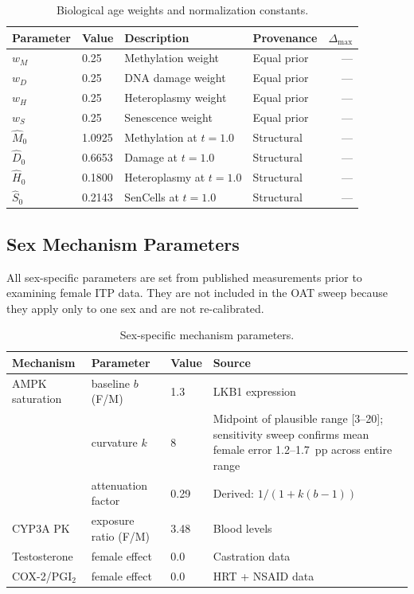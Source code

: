 \documentclass[11pt]{article}
\begin{document}
\begin{table}[H]
\centering
\caption{Biological age weights and normalization constants.}
\begin{tabular}{|llllr|}
\hline
Parameter & Value & Description & Provenance & $\Delta_{\max}$ \\
\hline
$w_M$ & 0.25 & Methylation weight & Equal prior & --- \\
\hline
$w_D$ & 0.25 & DNA damage weight & Equal prior & --- \\
\hline
$w_H$ & 0.25 & Heteroplasmy weight & Equal prior & --- \\
\hline
$w_S$ & 0.25 & Senescence weight & Equal prior & --- \\
\hline
$\hat{M}_0$ & 1.0925 & Methylation at $t=1.0$ & Structural & --- \\
\hline
$\hat{D}_0$ & 0.6653 & Damage at $t=1.0$ & Structural & --- \\
\hline
$\hat{H}_0$ & 0.1800 & Heteroplasmy at $t=1.0$ & Structural & --- \\
\hline
$\hat{S}_0$ & 0.2143 & SenCells at $t=1.0$ & Structural & --- \\
\hline
\end{tabular}
\end{table}

\subsection{Sex Mechanism Parameters}

All sex-specific parameters are set from published measurements prior to examining female ITP data. They are not included in the OAT sweep because they apply only to one sex and are not re-calibrated.

\begin{table}[H]
\centering
\caption{Sex-specific mechanism parameters.}
\begin{tabular}{|lll|p{7.5cm}|}
\hline
Mechanism & Parameter & Value & Source \\
\hline
AMPK saturation & baseline $b$ (F/M) & 1.3 & LKB1 expression \citep{McInnes2011} \\
\hline
 & curvature $k$ & 8 & Midpoint of plausible range [3--20]; sensitivity sweep confirms mean female error 1.2--1.7~pp across entire range \\
\hline
 & attenuation factor & 0.29 & Derived: $1/(1+k(b-1))$ \\
\hline
CYP3A PK & exposure ratio (F/M) & 3.48 & Blood levels \citep{Lamming2014} \\
\hline
Testosterone & female effect & 0.0 & Castration data \citep{Garratt2018} \\
\hline
COX-2/PGI$_2$ & female effect & 0.0 & HRT + NSAID data \citep{Egan2004} \\
\hline
\end{tabular}
\end{table}
\end{document}
